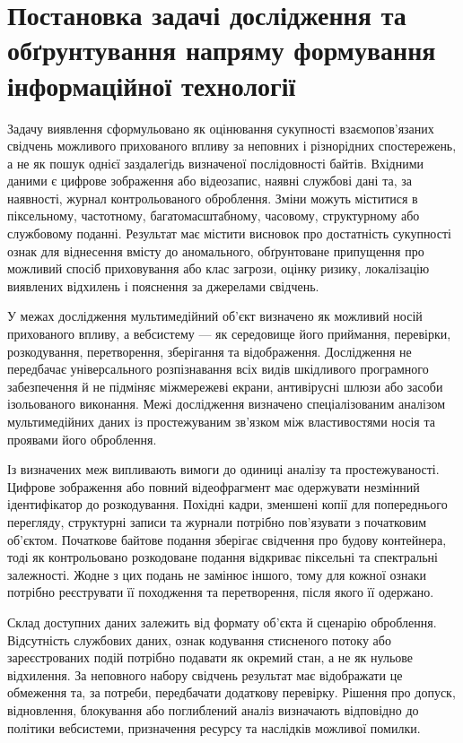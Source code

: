 \section{Постановка задачі дослідження та обґрунтування напряму формування інформаційної технології}
\label{sec:research_problem}

Задачу виявлення сформульовано як оцінювання сукупності взаємопов’язаних свідчень можливого прихованого впливу за неповних і різнорідних спостережень, а не як пошук однієї заздалегідь визначеної послідовності байтів. Вхідними даними є цифрове зображення або відеозапис, наявні службові дані та, за наявності, журнал контрольованого оброблення. Зміни можуть міститися в піксельному, частотному, багатомасштабному, часовому, структурному або службовому поданні. Результат має містити висновок про достатність сукупності ознак для віднесення вмісту до аномального, обґрунтоване припущення про можливий спосіб приховування або клас загрози, оцінку ризику, локалізацію виявлених відхилень і пояснення за джерелами свідчень.

У межах дослідження мультимедійний об’єкт визначено як можливий носій прихованого впливу, а вебсистему --- як середовище його приймання, перевірки, розкодування, перетворення, зберігання та відображення. Дослідження не передбачає універсального розпізнавання всіх видів шкідливого програмного забезпечення й не підміняє міжмережеві екрани, антивірусні шлюзи або засоби ізольованого виконання. Межі дослідження визначено спеціалізованим аналізом мультимедійних даних із простежуваним зв’язком між властивостями носія та проявами його оброблення.

Із визначених меж випливають вимоги до одиниці аналізу та простежуваності. Цифрове зображення або повний відеофрагмент має одержувати незмінний ідентифікатор до розкодування. Похідні кадри, зменшені копії для попереднього перегляду, структурні записи та журнали потрібно пов’язувати з початковим об’єктом. Початкове байтове подання зберігає свідчення про будову контейнера, тоді як контрольовано розкодоване подання відкриває піксельні та спектральні залежності. Жодне з цих подань не замінює іншого, тому для кожної ознаки потрібно реєструвати її походження та перетворення, після якого її одержано.

Склад доступних даних залежить від формату об’єкта й сценарію оброблення. Відсутність службових даних, ознак кодування стисненого потоку або зареєстрованих подій потрібно подавати як окремий стан, а не як нульове відхилення. За неповного набору свідчень результат має відображати це обмеження та, за потреби, передбачати додаткову перевірку. Рішення про допуск, відновлення, блокування або поглиблений аналіз визначають відповідно до політики вебсистеми, призначення ресурсу та наслідків можливої помилки.


